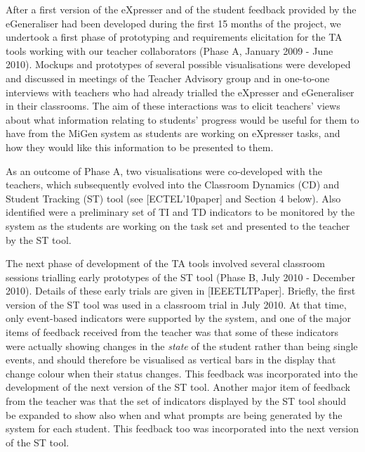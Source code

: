 After a first version of the eXpresser and of the student feedback
provided by the eGeneraliser had been developed during the first 15
months of the project, we undertook a first phase of prototyping and
requirements elicitation for the TA tools working with our teacher
collaborators (Phase A, January 2009 - June 2010). Mockups and
prototypes of several possible visualisations were developed and
discussed in meetings of the Teacher Advisory group and in one-to-one
interviews with teachers who had already trialled the eXpresser and
eGeneraliser in their classrooms. The aim of these interactions was to
elicit teachers' views about what information relating to students'
progress would be useful for them to have from the MiGen system as
students are working on eXpresser tasks, and how they would like this
information to be presented to them.
  
As an outcome of Phase A, two visualisations were co-developed with
the teachers, which subsequently evolved into the Classroom Dynamics
(CD) and Student Tracking (ST) tool (see [ECTEL’10paper] and Section 4
below). Also identified were a preliminary set of TI and TD indicators
to be monitored by the system as the students are working on the task
set and presented to the teacher by the ST tool.

The next phase of development of the TA tools involved several
classroom sessions trialling early prototypes of the ST tool (Phase B,
July 2010 - December 2010). Details of these early trials are given in
[IEEETLTPaper]. Briefly, the first version of the ST tool was used in
a classroom trial in July 2010. At that time, only event-based
indicators were supported by the system, and one of the major items of
feedback received from the teacher was that some of these indicators
were actually showing changes in the {\em state} of the student rather
than being single events, and should therefore be visualised as
vertical bars in the display that change colour when their status
changes. This feedback was incorporated into the development of the
next version of the ST tool. Another major item of feedback from the
teacher was that the set of indicators displayed by the ST tool should
be expanded to show also when and what prompts are being generated by
the system for each student. This feedback too was incorporated into
the next version of the ST tool.
 
